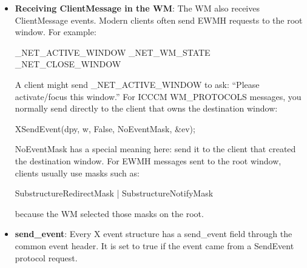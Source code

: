 \documentclass{report}
\begin{document}
\begin{itemize}
\begin{cppcode}
{                XFree(protocols);
                return found;
            }
        \end{cppcode}
        \bigbreak \noindent 
        For strict ICCCM behavior, prefer a real event timestamp instead of \textbf{CurrentTime} when you have one.
        \bigbreak \noindent 
        The WM sends the message, and the client decides how to react.
    \item \textbf{Receiving ClientMessage in the WM}: The WM also receives ClientMessage events.
        \bigbreak \noindent 
        Modern clients often send EWMH requests to the root window. For example:
        \bigbreak \noindent 
        \begin{cppcode}
            _NET_ACTIVE_WINDOW
            _NET_WM_STATE
            _NET_CLOSE_WINDOW
        \end{cppcode}
        \bigbreak \noindent 
        A client might send \_NET\_ACTIVE\_WINDOW to ask: “Please activate/focus this window.”
        \bigbreak \noindent 
        For ICCCM WM\_PROTOCOLS messages, you normally send directly to the client that owns the destination window:
        \bigbreak \noindent 
        \begin{cppcode}
            XSendEvent(dpy, w, False, NoEventMask, &ev);
        \end{cppcode}
        \bigbreak \noindent 
        NoEventMask has a special meaning here: send it to the client that created the destination window.
        \bigbreak \noindent 
        For EWMH messages sent to the root window, clients usually use masks such as:
        \bigbreak \noindent 
        \begin{cppcode}
            SubstructureRedirectMask | SubstructureNotifyMask
        \end{cppcode}
        \bigbreak \noindent 
        because the WM selected those masks on the root.
    \item \textbf{send\_event}: Every X event structure has a send\_event field through the common event header. It is set to true if the event came from a SendEvent protocol request.


    \end{itemize}
\end{document}
